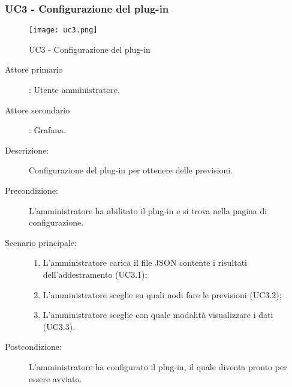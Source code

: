 \newpage
\subsubsection{UC3 - Configurazione del plug-in}
\label{sssec:uc3}

\begin{figure}[h!]
  \begin{center}
    \texttt{[image: uc3.png]}\\
    \caption{UC3 - Configurazione del plug-in}%
    \label{fig:uc3}
  \end{center}
  \end{figure}

\begin{description}
  \item[Attore primario]: Utente amministratore.
  \item[Attore secondario]: Grafana.
  \item[Descrizione:] Configurazione del plug-in per ottenere delle previsioni.
  \item[Precondizione:] L'amministratore ha abilitato il plug-in e si trova nella pagina di configurazione.
  \item[Scenario principale:]
  \begin{enumerate}
    \item L'amministratore carica il file JSON contente i risultati dell'addestramento (UC3.1);
    \item L'amministratore sceglie su quali nodi fare le previsioni (UC3.2);
    \item L'amministratore sceglie con quale modalità visualizzare i dati (UC3.3).
  \end{enumerate}
  \item[Postcondizione:] L'amministratore ha configurato il plug-in, il quale diventa pronto per essere avviato.
\end{description}

